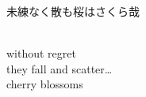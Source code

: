 \documentclass{memoir}
\begin{document}
\begin{CJK}{UTF8}{min}未練なく散も桜はさくら哉\end{CJK} \\
without regret \\
they fall and scatter\ldots \\
cherry blossoms
\end{document}
